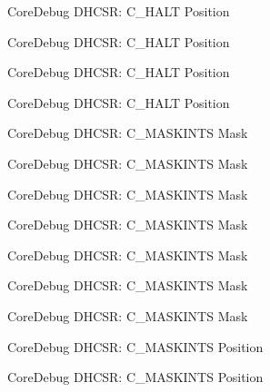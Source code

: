 \begin{DoxyRefList}
\label{deprecated__deprecated000264}%
%
Core\+Debug D\+H\+C\+SR\+: C\+\_\+\+H\+A\+LT Position 

\label{deprecated__deprecated000323}%
%
Core\+Debug D\+H\+C\+SR\+: C\+\_\+\+H\+A\+LT Position 

\label{deprecated__deprecated000399}%
%
Core\+Debug D\+H\+C\+SR\+: C\+\_\+\+H\+A\+LT Position 

\label{deprecated__deprecated000488}%
%
Core\+Debug D\+H\+C\+SR\+: C\+\_\+\+H\+A\+LT Position  
\item[Member \mbox{\hyperlink{group__CMSIS__CoreDebug_ga77fe1ef3c4a729c1c82fb62a94a51c31}{Core\+Debug\+\_\+\+D\+H\+C\+S\+R\+\_\+\+C\+\_\+\+M\+A\+S\+K\+I\+N\+T\+S\+\_\+\+Msk}} ]\label{deprecated__deprecated000034}%
%
Core\+Debug D\+H\+C\+SR\+: C\+\_\+\+M\+A\+S\+K\+I\+N\+TS Mask 

\label{deprecated__deprecated000122}%
%
Core\+Debug D\+H\+C\+SR\+: C\+\_\+\+M\+A\+S\+K\+I\+N\+TS Mask 

\label{deprecated__deprecated000178}%
%
Core\+Debug D\+H\+C\+SR\+: C\+\_\+\+M\+A\+S\+K\+I\+N\+TS Mask 

\label{deprecated__deprecated000261}%
%
Core\+Debug D\+H\+C\+SR\+: C\+\_\+\+M\+A\+S\+K\+I\+N\+TS Mask 

\label{deprecated__deprecated000320}%
%
Core\+Debug D\+H\+C\+SR\+: C\+\_\+\+M\+A\+S\+K\+I\+N\+TS Mask 

\label{deprecated__deprecated000396}%
%
Core\+Debug D\+H\+C\+SR\+: C\+\_\+\+M\+A\+S\+K\+I\+N\+TS Mask 

\label{deprecated__deprecated000485}%
%
Core\+Debug D\+H\+C\+SR\+: C\+\_\+\+M\+A\+S\+K\+I\+N\+TS Mask  
\item[Member \mbox{\hyperlink{group__CMSIS__CoreDebug_ga0d2907400eb948a4ea3886ca083ec8e3}{Core\+Debug\+\_\+\+D\+H\+C\+S\+R\+\_\+\+C\+\_\+\+M\+A\+S\+K\+I\+N\+T\+S\+\_\+\+Pos}} ]\label{deprecated__deprecated000033}%
%
Core\+Debug D\+H\+C\+SR\+: C\+\_\+\+M\+A\+S\+K\+I\+N\+TS Position 

\label{deprecated__deprecated000121}%
%
Core\+Debug D\+H\+C\+SR\+: C\+\_\+\+M\+A\+S\+K\+I\+N\+TS Position 


\end{DoxyRefList}
